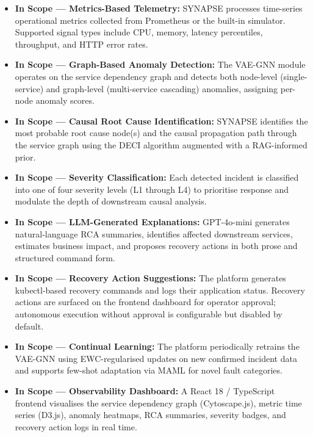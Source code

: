 \begin{itemize}
    \item \textbf{In Scope — Metrics-Based Telemetry:} SYNAPSE processes time-series operational metrics collected from Prometheus or the built-in simulator. Supported signal types include CPU, memory, latency percentiles, throughput, and HTTP error rates.

    \item \textbf{In Scope — Graph-Based Anomaly Detection:} The VAE-GNN module operates on the service dependency graph and detects both node-level (single-service) and graph-level (multi-service cascading) anomalies, assigning per-node anomaly scores.

    \item \textbf{In Scope — Causal Root Cause Identification:} SYNAPSE identifies the most probable root cause node(s) and the causal propagation path through the service graph using the DECI algorithm augmented with a RAG-informed prior.

    \item \textbf{In Scope — Severity Classification:} Each detected incident is classified into one of four severity levels (L1 through L4) to prioritise response and modulate the depth of downstream causal analysis.

    \item \textbf{In Scope — LLM-Generated Explanations:} GPT-4o-mini generates natural-language RCA summaries, identifies affected downstream services, estimates business impact, and proposes recovery actions in both prose and structured command form.

    \item \textbf{In Scope — Recovery Action Suggestions:} The platform generates kubectl-based recovery commands and logs their application status. Recovery actions are surfaced on the frontend dashboard for operator approval; autonomous execution without approval is configurable but disabled by default.

    \item \textbf{In Scope — Continual Learning:} The platform periodically retrains the VAE-GNN using EWC-regularised updates on new confirmed incident data and supports few-shot adaptation via MAML for novel fault categories.

    \item \textbf{In Scope — Observability Dashboard:} A React 18 / TypeScript frontend visualises the service dependency graph (Cytoscape.js), metric time series (D3.js), anomaly heatmaps, RCA summaries, severity badges, and recovery action logs in real time.


\end{itemize}
